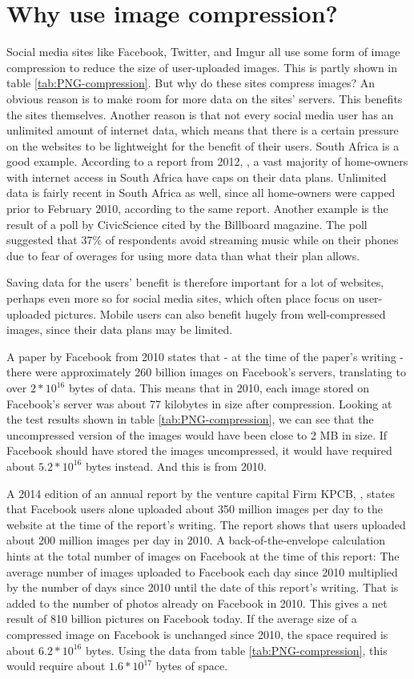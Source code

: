 \section{Why use image compression?}
Social media sites like Facebook, Twitter, and Imgur all use some form of image compression to reduce the size of user-uploaded images.
This is partly shown in table \ref{tab:PNG-compression}.
But why do these sites compress images?
An obvious reason is to make room for more data on the sites' servers.
This benefits the sites themselves.
Another reason is that not every social media user has an unlimited amount of internet data, which means that there is a certain pressure on the websites to be lightweight for the benefit of their users.
South Africa is a good example. According to a report from 2012, \citep{chetty_2012}, a vast majority of home-owners with internet access in South Africa have caps on their data plans.
Unlimited data is fairly recent in South Africa as well, since all home-owners were capped prior to February 2010, according to the same report.
Another example is the result of a poll by CivicScience\citep{tmobilemusic} cited by the Billboard magazine.
The poll suggested that 37\% of respondents avoid streaming music while on their phones due to fear of overages for using more data than what their plan allows.

Saving data for the users' benefit is therefore important for a lot of websites, perhaps even more so for social media sites, which often place focus on user-uploaded pictures. Mobile users can also benefit hugely from well-compressed images, since their data plans may be limited.

A paper by Facebook from 2010 \citep{beaver2010} states that - at the time of the paper's writing - there were approximately 260 billion images on Facebook's servers, translating to over $2*10^{16}$ bytes of data.
This means that in 2010, each image stored on Facebook's server was about 77 kilobytes in size after compression.
Looking at the test results shown in table \ref{tab:PNG-compression}, we can see that the uncompressed version of the images would have been close to 2 MB in size.
If Facebook should have stored the images uncompressed, it would have required about $5.2*10^{16}$ bytes instead.
And this is from 2010.

A 2014 edition of an annual report by the venture capital Firm KPCB, \citep{meeker2014internet}, states that Facebook users alone uploaded about
350 million images per day to the website at the time of the report's writing.
The report shows that users uploaded about 200 million images per day in 2010.
A back-of-the-envelope calculation hints at the total number of images on Facebook at the time of this report:
The average number of images uploaded to Facebook each day since 2010 multiplied by the number of days since 2010 until the date of this report's writing.
That is added to the number of photos already on Facebook in 2010.
This gives a net result of 810 billion pictures on Facebook today.
If the average size of a compressed image on Facebook is unchanged since 2010, the space required is about $6.2*10^{16}$ bytes.
Using the data from table \ref{tab:PNG-compression}, this would require about $1.6*10^{17}$ bytes of space.

